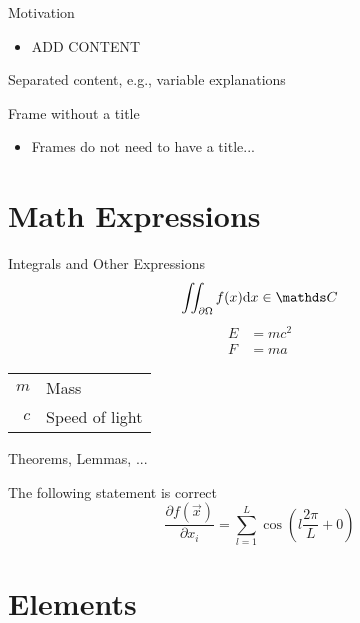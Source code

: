 \begin{frame}{Motivation}
	\begin{itemize}
		\item {ADD CONTENT}
	\end{itemize}
	
	\seprule
	
	Separated content, e.g., variable explanations
\end{frame}
\begin{frame}
	Frame without a title
	\begin{itemize}
		\item Frames do not need to have a title...
	\end{itemize}
\end{frame}

\section{Math Expressions}
\begin{frame}{Integrals and Other Expressions}
	\begin{equation}
		\iint_{\partial\Omega}f(x)\diff{x} \in \complexes
	\end{equation}
	\begin{align}
		E &= mc^2\\
		F &= ma
	\end{align}

	\seprule
	
	\begin{tabular}{rl}
		$m$ & Mass\\
		$c$ & Speed of light
	\end{tabular}
\end{frame}
\begin{frame}{Theorems, Lemmas, ...}
	\begin{thm}
		The following statement is correct
		\begin{equation}
			\frac{\partial f(\vec{x})}{\partial x_i} = \sum_{l=1}^{L}\cos\left(l\frac{2\pi}{L} + 0\right)
		\end{equation}
	\end{thm}
\end{frame}

\section{Elements}

